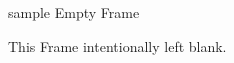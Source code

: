 \begin{frame}{sample Empty Frame}


    {\Large This Frame intentionally left blank.}
    
\end{frame}